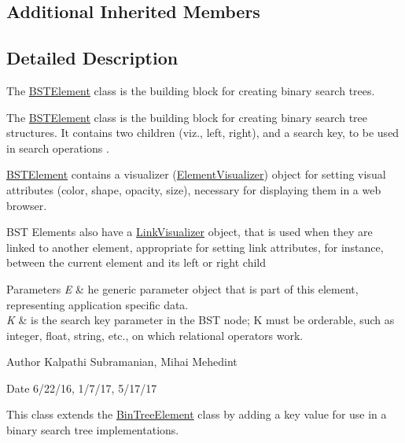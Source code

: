 \subsection*{Additional Inherited Members}


\subsection{Detailed Description}
The \mbox{\hyperlink{classbridges_1_1base_1_1_b_s_t_element}{B\+S\+T\+Element}} class is the building block for creating binary search trees. 

The \mbox{\hyperlink{classbridges_1_1base_1_1_b_s_t_element}{B\+S\+T\+Element}} class is the building block for creating binary search tree structures. It contains two children (viz., left, right), and a search key, to be used in search operations .

\mbox{\hyperlink{classbridges_1_1base_1_1_b_s_t_element}{B\+S\+T\+Element}} contains a visualizer (\mbox{\hyperlink{classbridges_1_1base_1_1_element_visualizer}{Element\+Visualizer}}) object for setting visual attributes (color, shape, opacity, size), necessary for displaying them in a web browser.

B\+ST Elements also have a \mbox{\hyperlink{classbridges_1_1base_1_1_link_visualizer}{Link\+Visualizer}} object, that is used when they are linked to another element, appropriate for setting link attributes, for instance, between the current element and its left or right child


\begin{DoxyParams}{Parameters}
{\em E} & he generic parameter object that is part of this element, representing application specific data. \\
\hline
{\em K} & is the search key parameter in the B\+ST node; K must be orderable, such as integer, float, string, etc., on which relational operators work.\\
\hline
\end{DoxyParams}
\begin{DoxyAuthor}{Author}
Kalpathi Subramanian, Mihai Mehedint
\end{DoxyAuthor}
\begin{DoxyDate}{Date}
6/22/16, 1/7/17, 5/17/17
\end{DoxyDate}
This class extends the \mbox{\hyperlink{classbridges_1_1base_1_1_bin_tree_element}{Bin\+Tree\+Element}} class by adding a \textquotesingle{}key\textquotesingle{} value for use in a binary search tree implementations.

